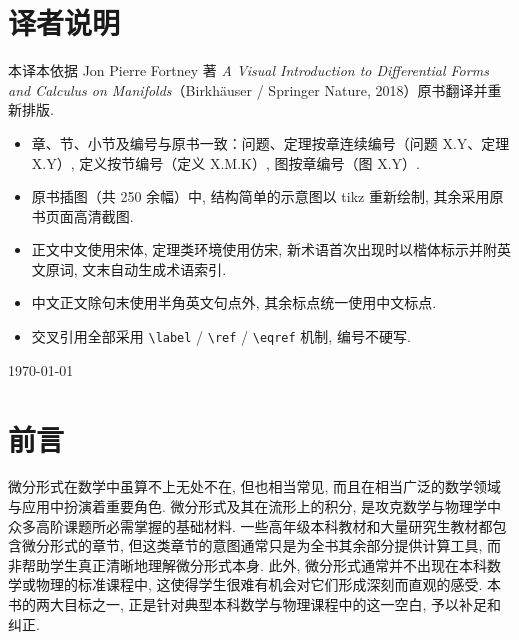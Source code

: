 \documentclass[
    BookTitleCN={微分形式与流形上的微积分：可视化导引},
    BookTitleEN={A Visual Introduction to Differential Forms and Calculus on Manifolds},
    OriginalAuthor={Jon Pierre Fortney},
    OriginalEdition={Birkhäuser},
    OriginalPublisher={Springer Nature},
    OriginalYear={2018},
    Translator={Fingolfin},
    ModelUsed={Qwen-Code},
    BibStyle=numeric
]{mathtranslation}
\theoremstyle{mtsong}
\begin{document}
\makecover

\frontmatter

\chapter*{译者说明}

本译本依据 Jon Pierre Fortney 著 \textit{A Visual Introduction to Differential Forms and Calculus on Manifolds}（Birkhäuser / Springer Nature, 2018）原书翻译并重新排版.

\begin{itemize}
  \item 章、节、小节及编号与原书一致：问题、定理按章连续编号（问题 X.Y、定理 X.Y）, 定义按节编号（定义 X.M.K）, 图按章编号（图 X.Y）.
  \item 原书插图（共 250 余幅）中, 结构简单的示意图以 tikz 重新绘制, 其余采用原书页面高清截图.
  \item 正文中文使用宋体, 定理类环境使用仿宋, 新术语首次出现时以楷体标示并附英文原词, 文末自动生成术语索引.
  \item 中文正文除句末使用半角英文句点外, 其余标点统一使用中文标点.
  \item 交叉引用全部采用 \verb|\label| / \verb|\ref| / \verb|\eqref| 机制, 编号不硬写.
\end{itemize}

\vspace{0.5cm}
\hfill \Translator

\hfill \today

\makecontents

\chapter*{前言}

微分形式在数学中虽算不上无处不在, 但也相当常见, 而且在相当广泛的数学领域与应用中扮演着重要角色. 微分形式及其在流形上的积分, 是攻克数学与物理学中众多高阶课题所必需掌握的基础材料. 一些高年级本科教材和大量研究生教材都包含微分形式的章节, 但这类章节的意图通常只是为全书其余部分提供计算工具, 而非帮助学生真正清晰地理解微分形式本身. 此外, 微分形式通常并不出现在本科数学或物理的标准课程中, 这使得学生很难有机会对它们形成深刻而直观的感受. 本书的两大目标之一, 正是针对典型本科数学与物理课程中的这一空白, 予以补足和纠正.
\end{document}
